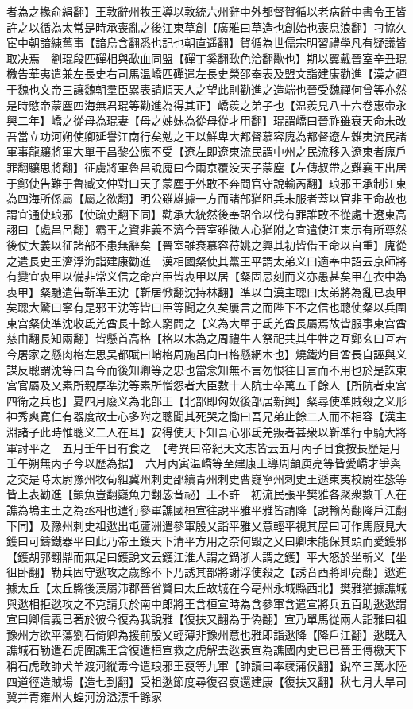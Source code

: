者為之掾俞絹翻】王敦辭州牧王導以敦統六州辭中外都督賀循以老病辭中書令王皆許之以循為太常是時承喪亂之後江東草創【廣雅曰草造也創始也喪息浪翻】刁協久宦中朝諳練舊事【諳烏含翻悉也記也朝直遥翻】賀循為世儒宗明習禮學凡有疑議皆取决焉　劉琨段匹磾相與歃血同盟【磾丁奚翻歃色洽翻歠也】期以翼戴晉室辛丑琨檄告華夷遣兼左長史右司馬温嶠匹磾遣左長史榮邵奉表及盟文詣建康勸進【漢之禪于魏也文帝三讓魏朝羣臣累表請順天人之望此則勸進之造端也晉受魏禪何曾等亦然是時愍帝蒙塵四海無君琨等勸進為得其正】嶠羨之弟子也【温羨見八十六卷惠帝永興二年】嶠之從母為琨妻【母之姊妹為從母從才用翻】琨謂嶠曰晉祚雖衰天命未改吾當立功河朔使卿延譽江南行矣勉之王以鮮卑大都督慕容廆為都督遼左雜夷流民諸軍事龍驤將軍大單于昌黎公廆不受【遼左即遼東流民謂中州之民流移入遼東者廆戶罪翻驤思將翻】征虜將軍魯昌說廆曰今兩京覆没天子蒙塵【左傳叔帶之難襄王出居于鄭使告難于魯臧文仲對曰天子蒙塵于外敢不奔問官守說輸芮翻】琅邪王承制江東為四海所係屬【屬之欲翻】明公雖雄據一方而諸部猶阻兵未服者蓋以官非王命故也謂宜通使琅邪【使疏吏翻下同】勸承大統然後奉詔令以伐有罪誰敢不從處士遼東高詡曰【處昌呂翻】霸王之資非義不濟今晉室雖微人心猶附之宜遣使江東示有所尊然後仗大義以征諸部不患無辭矣【晉室雖衰慕容苻姚之興其初皆借王命以自重】廆從之遣長史王濟浮海詣建康勸進　漢相國粲使其黨王平謂太弟义曰適奉中詔云京師將有變宜衷甲以備非常义信之命宫臣皆衷甲以居【粲固忌刻而义亦愚甚矣甲在衣中為衷甲】粲馳遣告靳凖王沈【靳居惞翻沈持林翻】凖以白漢主聰曰太弟將為亂已衷甲矣聰大驚曰寧有是邪王沈等皆曰臣等聞之久矣屢言之而陛下不之信也聰使粲以兵圍東宫粲使凖沈收氐羌酋長十餘人窮問之【义為大單于氐羌酋長屬焉故皆服事東宫酋慈由翻長知兩翻】皆懸首高格【格以木為之周禮牛人祭祀共其牛牲之互鄭玄曰互若今屠家之懸肉格左思吴都賦曰峭格周施呂向曰格懸網木也】燒鐵灼目酋長自誣與义謀反聰謂沈等曰吾今而後知卿等之忠也當念知無不言勿恨往日言而不用也於是誅東宫官屬及乂素所親厚凖沈等素所憎怨者大臣數十人阬士卒萬五千餘人【所阬者東宫四衛之兵也】夏四月廢义為北部王【北部即匈奴後部居新興】粲尋使凖賊殺之义形神秀爽寛仁有器度故士心多附之聰聞其死哭之慟曰吾兄弟止餘二人而不相容【漢主淵諸子此時惟聰义二人在耳】安得使天下知吾心邪氐羌叛者甚衆以靳凖行車騎大將軍討平之　五月壬午日有食之　【考異曰帝紀天文志皆云五月丙子日食按長歷是月壬午朔無丙子今以歷為据】　六月丙寅温嶠等至建康王導周顗庾亮等皆愛嶠才爭與之交是時太尉豫州牧荀組冀州刺史邵續青州刺史曹嶷寧州刺史王遜東夷校尉崔毖等皆上表勸進【顗魚豈翻嶷魚力翻毖音祕】王不許　初流民張平樊雅各聚衆數千人在譙為塢主王之為丞相也遣行參軍譙國桓宣往說平雅平雅皆請降【說輸芮翻降戶江翻下同】及豫州刺史祖逖出屯蘆洲遣參軍殷乂詣平雅乂意輕平視其屋曰可作馬廐見大鑊曰可鑄鐵器平曰此乃帝王鑊天下清平方用之奈何毁之乂曰卿未能保其頭而愛鑊邪【鑊胡郭翻鼎而無足曰鑊說文云鑊江淮人謂之鍋浙人謂之鑊】平大怒於坐斬义【坐徂卧翻】勒兵固守逖攻之歲餘不下乃誘其部將謝浮使殺之【誘音酉將即亮翻】逖進據太丘【太丘縣後漢屬沛郡晉省賢曰太丘故城在今亳州永城縣西北】樊雅猶據譙城與逖相拒逖攻之不克請兵於南中郎將王含桓宣時為含參軍含遣宣將兵五百助逖逖謂宣曰卿信義已著於彼今復為我說雅【復扶又翻為于偽翻】宣乃單馬從兩人詣雅曰祖豫州方欲平蕩劉石倚卿為援前殷乂輕薄非豫州意也雅即詣逖降【降戶江翻】逖既入譙城石勒遣石虎圍譙王含復遣桓宣救之虎解去逖表宣為譙國内史已已晉王傳檄天下稱石虎敢帥犬羊渡河縱毒今遣琅邪王裒等九軍【帥讀曰率裦蒲侯翻】銳卒三萬水陸四道徑造賊場【造七到翻】受祖逖節度尋復召裒還建康【復扶又翻】秋七月大旱司冀并青雍州大蝗河汾溢漂千餘家

